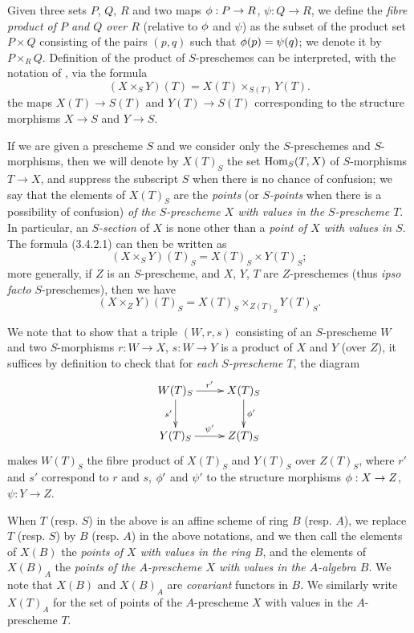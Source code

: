 \begin{env}[3.4.2]
\label{1.3.4.2}
Given three sets $P$, $Q$, $R$ and two maps $\vphi:P\to R$, $\psi:Q\to R$, we define the
\emph{fibre product of $P$ and $Q$ over $R$} (relative to $\phi$ and $\psi$) as the subset
of
the product set $P\times Q$ consisting of the pairs $(p,q)$ such that $\phi(p)=\psi(q)$; we
denote it by $P\times_R Q$. Definition  of the product
of $S$-preschemes can be interpreted, with the notation of ,
via the formula
\[
  (X\times_S Y)(T)=X(T)\times_{S(T)}Y(T).
  \tag{3.4.2.1}
\]
the maps $X(T)\to S(T)$ and $Y(T)\to S(T)$ corresponding to the structure morphisms
$X\to S$ and $Y\to S$.
\end{env}

\begin{env}[3.4.3]
\label{1.3.4.3}
If we are given a prescheme $S$ and we consider only the $S$-preschemes and $S$-morphisms,
then we will denote by $X(T)_S$ the set ${\mathop{\mathrm{Hom}}\nolimits}_S(T,X)$ of $S$-morphisms $T\to X$, and suppress
the subscript $S$ when there is no chance of confusion; we say that the elements of $X(T)_S$
are the \emph{points} (or \emph{$S$-points} when there is a possibility of confusion)
\emph{of the $S$-prescheme $X$ with values in the $S$-prescheme $T$}. In particular, an
\emph{$S$-section} of $X$ is none other than a \emph{point of $X$ with values in $S$}. The
formula (3.4.2.1) can then be written as
\[
  (X\times_S Y)(T)_S=X(T)_S\times Y(T)_S;
  \tag{3.4.3.1}
\]
more generally, if $Z$ is an $S$-prescheme, and $X$, $Y$, $T$ are $Z$-preschemes (thus
\emph{ipso facto} $S$-preschemes), then we have
\[
  (X\times_Z Y)(T)_S=X(T)_S\times_{Z(T)_S}Y(T)_S.
  \tag{3.4.3.2}
\]

We note that to show that a triple $(W,r,s)$ consisting of an $S$-prescheme $W$ and two
$S$-morphisms $r:W\to X$, $s:W\to Y$ is a product of $X$ and $Y$ (over $Z$), it suffices by
definition to check that for \emph{each $S$-prescheme $T$}, the diagram
\[
  \xymatrix{
    W(T)_S\ar[r]^{r'}\ar[d]_{s'} &
    X(T)_S\ar[d]^{\vphi'}\\
    Y(T)_S\ar[r]^{\psi'} &
    Z(T)_S
  }
\]
makes $W(T)_S$ the fibre product of $X(T)_S$ and $Y(T)_S$ over $Z(T)_S$, where $r'$ and $s'$
correspond to $r$ and $s$, $\phi'$ and $\psi'$ to the structure morphisms $\vphi:X\to Z$,
$\psi:Y\to Z$.
\end{env}

\begin{env}[3.4.4]
\label{1.3.4.4}
When $T$ (resp. $S$) in the above is an affine scheme of ring $B$ (resp. $A$), we replace
$T$ (resp. $S$) by $B$ (resp. $A$) in the above notations, and we then call the elements of
$X(B)$ the \emph{points of $X$ with values in the ring $B$}, and the elements of $X(B)_A$ the
\emph{points of the $A$-prescheme $X$ with values in the $A$-algebra $B$}. We note that
$X(B)$ and $X(B)_A$ are \emph{covariant} functors in $B$. We similarly write $X(T)_A$ for the
set of points of the $A$-prescheme $X$ with values in the $A$-prescheme $T$.
\end{env}

